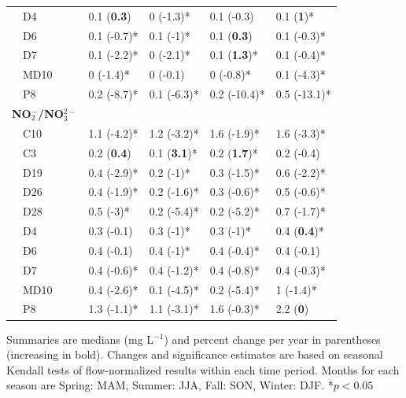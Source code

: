 \documentclass[letterpaper,12pt,oneside]{article}\usepackage[]{graphicx}\usepackage[]{color}
\begin{document}
\begin{table}[!tbp]
\begin{center}
\begin{tabular}{lllll}
~~D4&0.1 \footnotesize{(\textbf{0.3})}&0 \footnotesize{(-1.3)*}&0.1 \footnotesize{(-0.3)}&0.1 \footnotesize{(\textbf{1})*}\tabularnewline
~~D6&0.1 \footnotesize{(-0.7)*}&0.1 \footnotesize{(-1)*}&0.1 \footnotesize{(\textbf{0.3})}&0.1 \footnotesize{(-0.3)*}\tabularnewline
~~D7&0.1 \footnotesize{(-2.2)*}&0 \footnotesize{(-2.1)*}&0.1 \footnotesize{(\textbf{1.3})*}&0.1 \footnotesize{(-0.4)*}\tabularnewline
~~MD10&0 \footnotesize{(-1.4)*}&0 \footnotesize{(-0.1)}&0 \footnotesize{(-0.8)*}&0.1 \footnotesize{(-4.3)*}\tabularnewline
~~P8&0.2 \footnotesize{(-8.7)*}&0.1 \footnotesize{(-6.3)*}&0.2 \footnotesize{(-10.4)*}&0.5 \footnotesize{(-13.1)*}\tabularnewline
\hline
{\bfseries NO$_{2}^{-}$/NO$_{3}^{2-}$}&&&&\tabularnewline
~~C10&1.1 \footnotesize{(-4.2)*}&1.2 \footnotesize{(-3.2)*}&1.6 \footnotesize{(-1.9)*}&1.6 \footnotesize{(-3.3)*}\tabularnewline
~~C3&0.2 \footnotesize{(\textbf{0.4})}&0.1 \footnotesize{(\textbf{3.1})*}&0.2 \footnotesize{(\textbf{1.7})*}&0.2 \footnotesize{(-0.4)}\tabularnewline
~~D19&0.4 \footnotesize{(-2.9)*}&0.2 \footnotesize{(-1)*}&0.3 \footnotesize{(-1.5)*}&0.6 \footnotesize{(-2.2)*}\tabularnewline
~~D26&0.4 \footnotesize{(-1.9)*}&0.2 \footnotesize{(-1.6)*}&0.3 \footnotesize{(-0.6)*}&0.5 \footnotesize{(-0.6)*}\tabularnewline
~~D28&0.5 \footnotesize{(-3)*}&0.2 \footnotesize{(-5.4)*}&0.2 \footnotesize{(-5.2)*}&0.7 \footnotesize{(-1.7)*}\tabularnewline
~~D4&0.3 \footnotesize{(-0.1)}&0.3 \footnotesize{(-1)*}&0.3 \footnotesize{(-1)*}&0.4 \footnotesize{(\textbf{0.4})*}\tabularnewline
~~D6&0.4 \footnotesize{(-0.1)}&0.4 \footnotesize{(-1)*}&0.4 \footnotesize{(-0.4)*}&0.4 \footnotesize{(-0.1)}\tabularnewline
~~D7&0.4 \footnotesize{(-0.6)*}&0.4 \footnotesize{(-1.2)*}&0.4 \footnotesize{(-0.8)*}&0.4 \footnotesize{(-0.3)*}\tabularnewline
~~MD10&0.4 \footnotesize{(-2.6)*}&0.1 \footnotesize{(-4.5)*}&0.2 \footnotesize{(-5.4)*}&1 \footnotesize{(-1.4)*}\tabularnewline
~~P8&1.3 \footnotesize{(-1.1)*}&1.1 \footnotesize{(-3.1)*}&1.6 \footnotesize{(-0.3)*}&2.2 \footnotesize{(\textbf{0})}\tabularnewline
\hline
\end{tabular}\end{center}
\footnotesize Summaries are  medians (mg L$^{-1}$) and percent change per year in parentheses (increasing in bold). Changes and significance estimates are based on seasonal Kendall tests of flow-normalized results within each time period. Months for each season are Spring: MAM, Summer: JJA, Fall: SON, Winter: DJF. *$p<0.05$\end{table}
\end{document}
